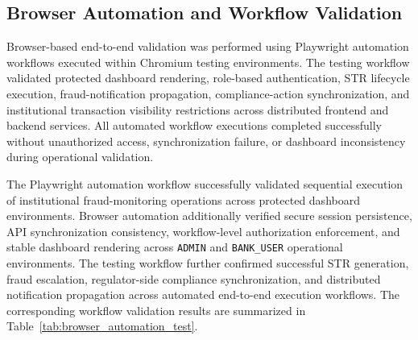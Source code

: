 \subsection[Browser Automation and Workflow Validation]{\textbf{Browser Automation and Workflow Validation}}

Browser-based end-to-end validation was performed using Playwright automation workflows executed within Chromium testing environments. The testing workflow validated protected dashboard rendering, role-based authentication, STR lifecycle execution, fraud-notification propagation, compliance-action synchronization, and institutional transaction visibility restrictions across distributed frontend and backend services. All automated workflow executions completed successfully without unauthorized access, synchronization failure, or dashboard inconsistency during operational validation.

The Playwright automation workflow successfully validated sequential execution of institutional fraud-monitoring operations across protected dashboard environments. Browser automation additionally verified secure session persistence, API synchronization consistency, workflow-level authorization enforcement, and stable dashboard rendering across \texttt{ADMIN} and \texttt{BANK\_USER} operational environments. The testing workflow further confirmed successful STR generation, fraud escalation, regulator-side compliance synchronization, and distributed notification propagation across automated end-to-end execution workflows. The corresponding workflow validation results are summarized in Table~\ref{tab:browser_automation_test}.

\renewcommand{\arraystretch}{1.3}

